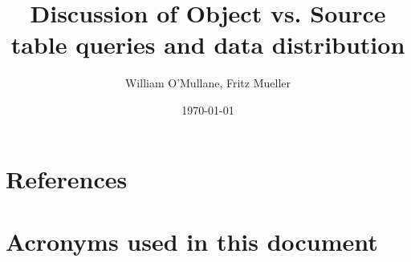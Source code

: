 \documentclass[PST,authoryear,toc]{lsstdoc}
\title{Discussion of Object vs. Source table queries and data distribution}
\author{%
William O'Mullane, Fritz Mueller
}
\date{\today}
\begin{document}

\mkshorttitle




\appendix
\section{References} \label{sec:bib}


\section{Acronyms used in this document}\label{sec:acronyms}

\end{document}
